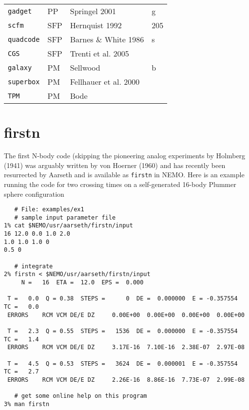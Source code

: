 \begin{center}
\begin{table}[h]
\begin{tabular}{||l|l|l|l||}
{\tt gadget} & PP & Springel 2001  & g \\

{\tt scfm} & SFP & Hernquist 1992 & 205 \\

{\tt quadcode} & SFP & Barnes \& White 1986 & s \\

{\tt CGS} & SFP &  Trenti et al. 2005 & \\

{\tt galaxy} & PM & Sellwood  & b \\

{\tt superbox} & PM &  Fellhauer et al. 2000 & \\

{\tt TPM} & PM &  Bode & \\


\hline 

\end{tabular}
\label{t:codes}
\end{table}
\end{center}

\section{firstn}

The first N-body code (skipping the pioneering analog experiments by 
Holmberg (1941)
was arguably written by von Hoerner (1960)  %
and has recently
been resurrected by Aarseth and is available as {\tt firstn} in NEMO. Here is an
example running the code for two crossing times on a self-generated 16-body
Plummer sphere configuration

\footnotesize\begin{verbatim}
   # File: examples/ex1
   # sample input parameter file
1% cat $NEMO/usr/aarseth/firstn/input
16 12.0 0.0 1.0 2.0
1.0 1.0 1.0 0
0.5 0

   # integrate 
2% firstn < $NEMO/usr/aarseth/firstn/input
     N =   16  ETA =  12.0  EPS =  0.000
 
 T =   0.0  Q = 0.38  STEPS =      0  DE =  0.000000  E = -0.357554  TC =   0.0
 ERRORS    RCM VCM DE/E DZ     0.00E+00  0.00E+00  0.00E+00  0.00E+00
 
 T =   2.3  Q = 0.55  STEPS =   1536  DE =  0.000000  E = -0.357554  TC =   1.4
 ERRORS    RCM VCM DE/E DZ     3.17E-16  7.10E-16  2.38E-07  2.97E-08
 
 T =   4.5  Q = 0.53  STEPS =   3624  DE =  0.000001  E = -0.357554  TC =   2.7
 ERRORS    RCM VCM DE/E DZ     2.26E-16  8.86E-16  7.73E-07  2.99E-08

   # get some online help on this program
3% man firstn
 
\end{verbatim}\normalsize

